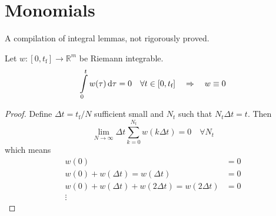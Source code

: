 \section{Monomials}\label{section:Monom}
A compilation of integral lemmas, not rigorously proved.
\begin{lemma}
Let $w:[0,t_\text{f}]\to \mathbb{R}^m$ be Riemann integrable. 
\begin{equation}
\int\limits_0^t w(\tau)\,\text{d} \tau =0 \quad \forall t\in [0,t_\text{f}] \quad \Rightarrow 
\quad w \equiv 0
\end{equation}
\begin{proof}
Define $\Delta t = t_\text{f}/N$ sufficient small and $N_t$ such that $N_t \Delta t = t$. 
Then 
\begin{equation}
\lim_{N\to \infty} \Delta t \sum\limits_{k=0}^{N_t}  w(k \Delta t) = 0 \quad \forall N_t
\end{equation}
which means
\begin{align}
w(0) &= 0 \\
w(0)+w(\Delta t) = w(\Delta t) &= 0\\
w(0)+w(\Delta t) + w(2\Delta t)= w(2\Delta t) &= 0 \\
\vdots   
\end{align}
\end{proof}
\end{lemma}
